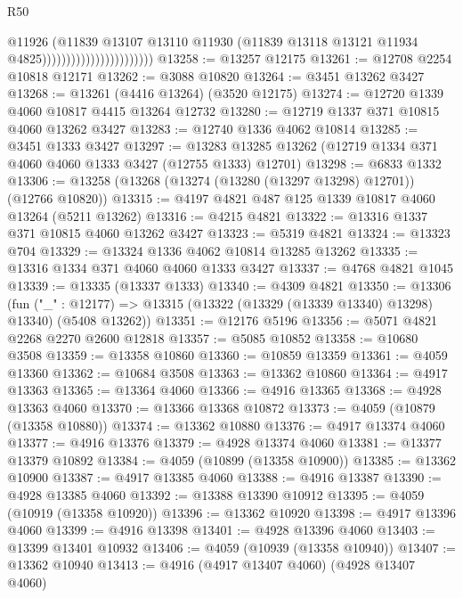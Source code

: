 \begin{lexlean}{R50}
\begin{coremodule}
                                              @11926
                                              (@11839
                                                @13107
                                                @13110
                                                @11930
                                                (@11839
                                                  @13118
                                                  @13121
                                                  @11934
                                                  @4825)))))))))))))))))))))))
@13258 := @13257 @12175
@13261 := @12708 @2254 @10818 @12171
@13262 := @3088 @10820
@13264 := @3451 @13262 @3427
@13268 := @13261 (@4416 @13264) (@3520 @12175)
@13274 := @12720 @1339 @4060 @10817 @4415 @13264 @12732
@13280 := @12719 @1337 @371 @10815 @4060 @13262 @3427
@13283 := @12740 @1336 @4062 @10814
@13285 := @3451 @1333 @3427
@13297 := @13283 @13285 @13262 (@12719 @1334 @371 @4060 @4060 @1333 @3427 (@12755 @1333) @12701)
@13298 := @6833 @1332
@13306 := @13258 (@13268 (@13274 (@13280 (@13297 @13298) @12701)) (@12766 @10820))
@13315 := @4197 @4821 @487 @125 @1339 @10817 @4060 @13264 (@5211 @13262)
@13316 := @4215 @4821
@13322 := @13316 @1337 @371 @10815 @4060 @13262 @3427
@13323 := @5319 @4821
@13324 := @13323 @704
@13329 := @13324 @1336 @4062 @10814 @13285 @13262
@13335 := @13316 @1334 @371 @4060 @4060 @1333 @3427
@13337 := @4768 @4821 @1045
@13339 := @13335 (@13337 @1333)
@13340 := @4309 @4821
@13350 := @13306
    (fun ("_" : @12177) => @13315 (@13322 (@13329 (@13339 @13340) @13298) @13340) (@5408 @13262))
@13351 := @12176 @5196
@13356 := @5071 @4821 @2268 @2270 @2600 @12818
@13357 := @5085 @10852
@13358 := @10680 @3508
@13359 := @13358 @10860
@13360 := @10859 @13359
@13361 := @4059 @13360
@13362 := @10684 @3508
@13363 := @13362 @10860
@13364 := @4917 @13363
@13365 := @13364 @4060
@13366 := @4916 @13365
@13368 := @4928 @13363 @4060
@13370 := @13366 @13368 @10872
@13373 := @4059 (@10879 (@13358 @10880))
@13374 := @13362 @10880
@13376 := @4917 @13374 @4060
@13377 := @4916 @13376
@13379 := @4928 @13374 @4060
@13381 := @13377 @13379 @10892
@13384 := @4059 (@10899 (@13358 @10900))
@13385 := @13362 @10900
@13387 := @4917 @13385 @4060
@13388 := @4916 @13387
@13390 := @4928 @13385 @4060
@13392 := @13388 @13390 @10912
@13395 := @4059 (@10919 (@13358 @10920))
@13396 := @13362 @10920
@13398 := @4917 @13396 @4060
@13399 := @4916 @13398
@13401 := @4928 @13396 @4060
@13403 := @13399 @13401 @10932
@13406 := @4059 (@10939 (@13358 @10940))
@13407 := @13362 @10940
@13413 := @4916 (@4917 @13407 @4060) (@4928 @13407 @4060)

\end{coremodule}
\end{lexlean}
